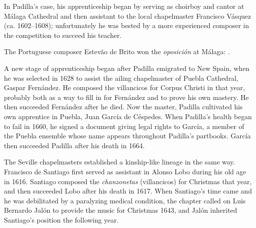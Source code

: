 In Padilla's case, his apprenticeship began by serving as choirboy and cantor at
Málaga Cathedral and then assistant to the local chapelmaster Francisco Vásquez
(ca. 1602--1608); unfortunately he was bested by a more experienced composer in
the competition to succeed his teacher.%
\begin{Footnote}
    The Portuguese composer Estevão de Brito won the \emph{oposición} at
    Málaga: \autocites{Gembero:Padilla}{Stevenson:BritoE}.
\end{Footnote}
A new stage of apprenticeship began after Padilla emigrated to New Spain, when
he was selected in 1628 to assist the ailing chapelmaster of Puebla Cathedral,
Gaspar Fernández.%
    \Autocite{Morales:Fernandez}
He composed the villancicos for Corpus Christi in that year, probably both as a
way to fill in for Fernández and to prove his own mastery.%
    \Autocite{Cashner:Cards}
He then succeeded Fernández after he died.
Now the master, Padilla cultivated his own apprentice in Puebla, Juan García de
Céspedes.
When Padilla's health began to fail in 1660, he signed a  document giving legal rights to García, a member of the Puebla
ensemble whose name appears throughout Padilla's partbooks.  García then
succeeded Padilla after his death in 1664.%
    \Autocite[237--238]{Mauleon:PadillaCivil}

The Seville chapelmasters established a kinship-like lineage in the same way.
Francisco de Santiago first served as assistant in Alonso Lobo during his old
age in 1616.%
    \Autocite{Stevenson:SantiagoF}
Santiago composed the \emph{chanzonetas} (villancicos) for Christmas that year,
and then succeeded Lobo after his death in 1617.
When Santiago's time came and he was debilitated by a paralyzing medical
condition, the chapter called on Luis Bernardo Jalón to provide the music for
Christmas 1643, and Jalón inherited Santiago's position the following year.

